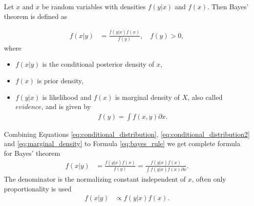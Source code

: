     \begin{definition}
    Let $x$ and $x$ be random variables with densities $f(y|x)$ and $f(x)$. Then Bayes' theorem is defined as
    \end{definition}
    \begin{align}
        f(x|y) &= \frac{f(y|x) f(x)}{f(y)}, \quad f(y) > 0,\label{eq:bayes_rule}
    \end{align}
where 
    \begin{itemize}
        \item $f(x|y) $ is the conditional posterior density of $x$,
        \item $f(x)$ is prior density,
        \item  $f(y|x)$ is likelihood and $f(x)$ is marginal density of $X$, also called $evidence$, and is given by 
            \begin{align}
            f(y) = \int f(x,y) \partial x \label{eq:marginal_density}.
            \end{align}
    \end{itemize}
    
Combining Equations \eqref{eq:conditional_distribution}, \eqref{eq:conditional_distribution2} and \eqref{eq:marginal_density} to Formula \eqref{eq:bayes_rule} we get complete formula for Bayes' theorem
    \begin{align}
        f(x|y) &= \frac{f(y|x) f(x)}{f(y)} = \frac{f(y|x) f(x)}{\int f(y|x) f(x) \partial x}. \label{eq:bayes_full}
    \end{align}
The denominator is the normalizing constant independent of $x$, often only proportionality is used
    \begin{align}
        f(x|y) &\propto f(y|x)f(x).
    \end{align}











    
